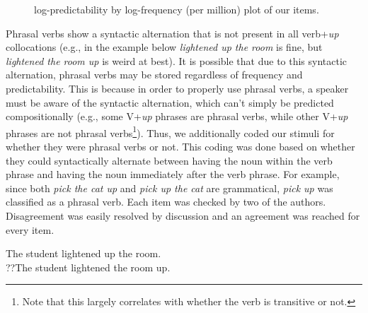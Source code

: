 \documentclass[
  12pt,
  letterpaper,
]{scrreprt}
\begin{document}
\begin{figure}[htbp]

\caption{\label{fig-stimplot}log-predictability by log-frequency (per
million) plot of our items.}


\end{figure}%

Phrasal verbs show a syntactic alternation that is not present in all
verb+\emph{up} collocations (e.g., in the example below \emph{lightened
up the room} is fine, but \emph{lightened the room up} is weird at
best). It is possible that due to this syntactic alternation, phrasal
verbs may be stored regardless of frequency and predictability. This is
because in order to properly use phrasal verbs, a speaker must be aware
of the syntactic alternation, which can't simply be predicted
compositionally (e.g., some V+\emph{up} phrases are phrasal verbs, while
other V+\emph{up} phrases are not phrasal verbs\footnote{Note that this
  largely correlates with whether the verb is transitive or not.}).
Thus, we additionally coded our stimuli for whether they were phrasal
verbs or not. This coding was done based on whether they could
syntactically alternate between having the noun within the verb phrase
and having the noun immediately after the verb phrase. For example,
since both \emph{pick the cat up} and \emph{pick up the cat} are
grammatical, \emph{pick up} was classified as a phrasal verb. Each item
was checked by two of the authors. Disagreement was easily resolved by
discussion and an agreement was reached for every item.

\begin{exe} 
\ex
  \begin{singlespace}
  \begin{xlist}
    \ex The student lightened up the room. \\
    \ex ??The student lightened the room up. \\
  \end{xlist}
  \end{singlespace}
\end{exe}
\end{document}
